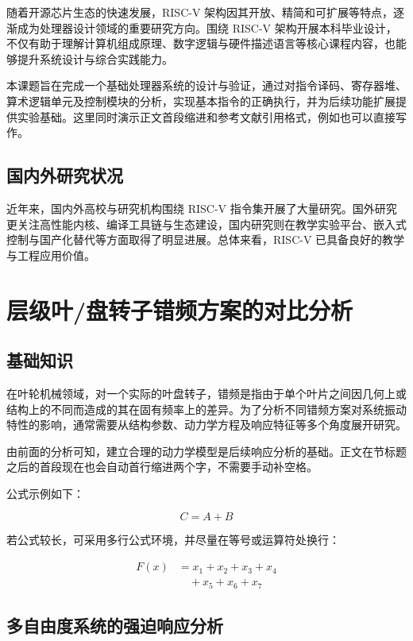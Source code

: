 \documentclass{hnnuthesis}
\begin{document}
随着开源芯片生态的快速发展，RISC-V 架构因其开放、精简和可扩展等特点，逐渐成为处理器设计领域的重要研究方向。围绕 RISC-V 架构开展本科毕业设计，不仅有助于理解计算机组成原理、数字逻辑与硬件描述语言等核心课程内容，也能够提升系统设计与综合实践能力。

本课题旨在完成一个基础处理器系统的设计与验证，通过对指令译码、寄存器堆、算术逻辑单元及控制模块的分析，实现基本指令的正确执行，并为后续功能扩展提供实验基础。这里同时演示正文首段缩进和参考文献引用格式，例如也可以直接写作\cite{ref1}。

\subsection{国内外研究状况}

近年来，国内外高校与研究机构围绕 RISC-V 指令集开展了大量研究。国外研究更关注高性能内核、编译工具链与生态建设，国内研究则在教学实验平台、嵌入式控制与国产化替代等方面取得了明显进展。总体来看，RISC-V 已具备良好的教学与工程应用价值。

\section{层级叶/盘转子错频方案的对比分析}

\subsection{基础知识}

在叶轮机械领域，对一个实际的叶盘转子，错频是指由于单个叶片之间因几何上或结构上的不同而造成的其在固有频率上的差异。为了分析不同错频方案对系统振动特性的影响，通常需要从结构参数、动力学方程及响应特征等多个角度展开研究。

由前面的分析可知，建立合理的动力学模型是后续响应分析的基础。正文在节标题之后的首段现在也会自动首行缩进两个字，不需要手动补空格。

公式示例如下：

\begin{equation}
C = A + B
\end{equation}

若公式较长，可采用多行公式环境，并尽量在等号或运算符处换行：

\begin{align}
F(x) &= x_1 + x_2 + x_3 + x_4 \\
     &\quad + x_5 + x_6 + x_7
\end{align}

\subsection{多自由度系统的强迫响应分析}
\end{document}
